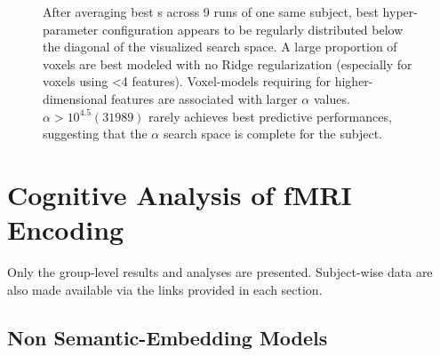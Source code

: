 \begin{figure}
\centering
            \caption[Subject Best Hyper-parameter Configuration Voxel-Count Heat-map]{After averaging  best s across 9 runs of one same subject, best hyper-parameter configuration appears to be regularly distributed below the diagonal of the visualized search space. A large proportion of voxels are best modeled with no Ridge regularization (especially for voxels using <4 features). Voxel-models requiring for higher-dimensional features are associated with larger \(\alpha\) values. \(\alpha > 10^{4.5} (31989)\) rarely achieves best predictive performances, suggesting that the \(\alpha\) search space is complete for the subject.} 
            \label{fig:MIX_HeatmapAlphaDimS1R0}
\end{figure}

\section{Cognitive Analysis of fMRI Encoding}

Only the group-level results and analyses are presented. Subject-wise data are also made available via the links provided in each section.

\subsection{Non Semantic-Embedding Models}

